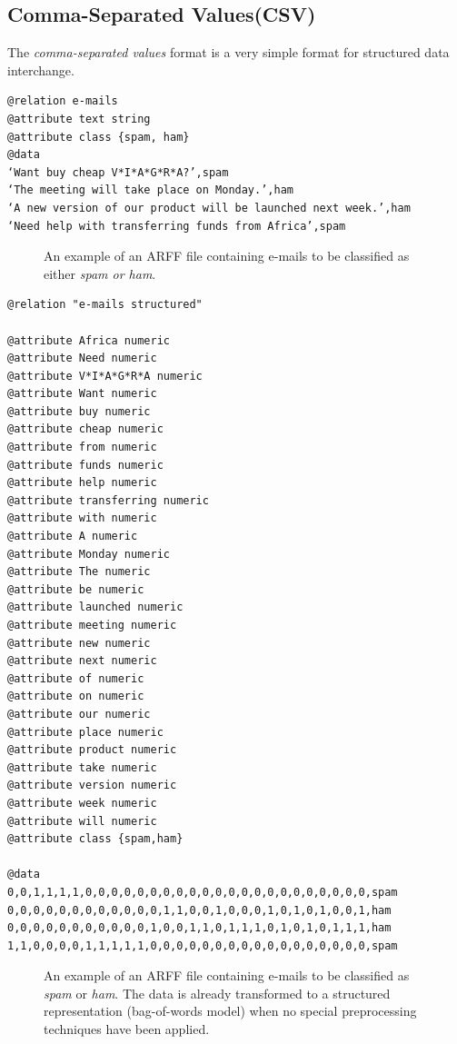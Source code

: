 \subsection{Comma-Separated Values(CSV)}

The \textit{comma-separated values} format is a very simple format for structured data
interchange.

\begin{verbatim}
@relation e-mails
@attribute text string
@attribute class {spam, ham}
@data
‘Want buy cheap V*I*A*G*R*A?’,spam
‘The meeting will take place on Monday.’,ham
‘A new version of our product will be launched next week.’,ham
‘Need help with transferring funds from Africa’,spam
\end{verbatim}

\begin{figure}[!ht]
    \centering
    \caption{An example of an ARFF file containing e-mails to be classified as either \textit{spam or
ham}.}
    \label{fig:placeholder39}
\end{figure}

\begin{verbatim}
@relation "e-mails structured"

@attribute Africa numeric
@attribute Need numeric
@attribute V*I*A*G*R*A numeric
@attribute Want numeric
@attribute buy numeric
@attribute cheap numeric
@attribute from numeric
@attribute funds numeric
@attribute help numeric
@attribute transferring numeric
@attribute with numeric
@attribute A numeric
@attribute Monday numeric
@attribute The numeric
@attribute be numeric
@attribute launched numeric
@attribute meeting numeric
@attribute new numeric
@attribute next numeric
@attribute of numeric
@attribute on numeric
@attribute our numeric
@attribute place numeric
@attribute product numeric
@attribute take numeric
@attribute version numeric
@attribute week numeric
@attribute will numeric
@attribute class {spam,ham}

@data
0,0,1,1,1,1,0,0,0,0,0,0,0,0,0,0,0,0,0,0,0,0,0,0,0,0,0,0,spam
0,0,0,0,0,0,0,0,0,0,0,0,1,1,0,0,1,0,0,0,1,0,1,0,1,0,0,1,ham
0,0,0,0,0,0,0,0,0,0,0,1,0,0,1,1,0,1,1,1,0,1,0,1,0,1,1,1,ham
1,1,0,0,0,0,1,1,1,1,1,0,0,0,0,0,0,0,0,0,0,0,0,0,0,0,0,0,spam
\end{verbatim}

\begin{figure}[H]
    \centering
    \caption{An example of an ARFF file containing e-mails to be classified as \textit{spam} or \textit{ham}.
The data is already transformed to a structured representation (bag-of-words model) when no
special preprocessing techniques have been applied.}
    \label{fig:placeholder310}
\end{figure}

